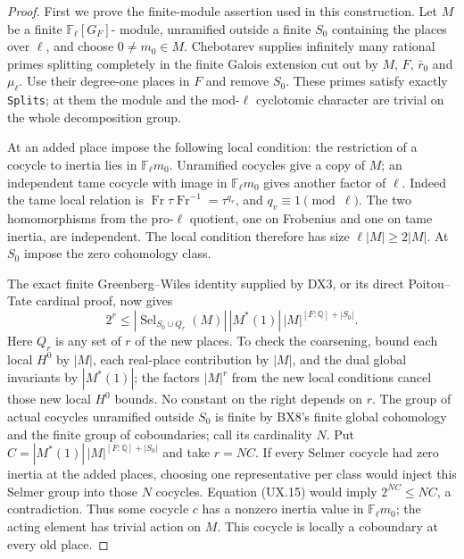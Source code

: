 \begin{proof}
First we prove the finite-module assertion used in this
construction.  Let $M$ be a finite $\mathbb F_\ell[G_F]$-
module, unramified outside a finite $S_0$ containing the
places over $\ell$, and choose $0\ne m_0\in M$.
Chebotarev supplies infinitely many rational primes
splitting completely in the finite Galois extension
cut out by $M$, $F$, $\bar r_0$ and $\mu_\ell$.
Use their degree-one places in $F$ and remove $S_0$.
These primes satisfy exactly \texttt{Splits}; at them
the module and the mod-$\ell$ cyclotomic character are
trivial on the whole decomposition group.

At an added place impose the following local condition:
the restriction of a cocycle to inertia lies in
$\mathbb F_\ell m_0$.  Unramified cocycles give a copy
of $M$; an independent tame cocycle with image in
$\mathbb F_\ell m_0$ gives another factor of $\ell$.
Indeed the tame local relation is
$\operatorname{Fr}\tau\operatorname{Fr}^{-1}=\tau^{q_v}$,
and $q_v\equiv1\pmod\ell$.  The two homomorphisms from
the pro-$\ell$ quotient, one on Frobenius and one on
tame inertia, are independent.  The local condition
therefore has size $\ell|M|\ge2|M|$.  At $S_0$ impose
the zero cohomology class.

The exact finite Greenberg--Wiles identity supplied by
DX3, or its direct Poitou--Tate cardinal proof, now gives
\[
 2^r\le |\operatorname{Sel}_{S_0\cup Q_r}(M)|\,
       |M^*(1)|\,|M|^{[F:\mathbb Q]+|S_0|}.
 \tag{UX.15}
\]
Here $Q_r$ is any set of $r$ of the new places.  To
check the coarsening, bound each local $H^0$ by $|M|$,
each real-place contribution by $|M|$, and the dual
global invariants by $|M^*(1)|$; the factors $|M|^r$
from the new local conditions cancel those new local
$H^0$ bounds.  No constant on the right depends on $r$.
The group of actual cocycles unramified outside $S_0$
is finite by BX8's finite global cohomology and the
finite group of coboundaries; call its cardinality $N$.
Put $C=|M^*(1)|\,|M|^{[F:\mathbb Q]+|S_0|}$ and take
$r=NC$.  If every Selmer cocycle had zero inertia at
the added places, choosing one representative per
class would inject this Selmer group into those $N$
cocycles.  Equation (UX.15) would imply $2^{NC}\le NC$,
a contradiction.  Thus some cocycle $c$ has a nonzero
inertia value in $\mathbb F_\ell m_0$; the acting
element has trivial action on $M$.  This cocycle is
locally a coboundary at every old place.


\end{proof}
